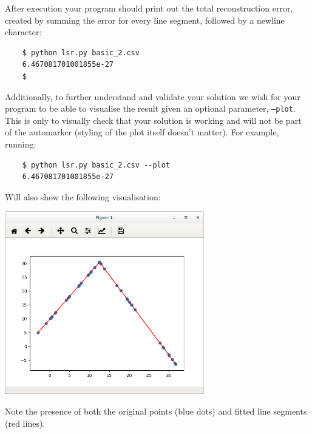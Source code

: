 \documentclass[12pt]{article}
\begin{document}
After execution your program should print out the total reconstruction error, created by summing the error for every line segment, followed by a newline character:

\begin{verbatim}
    $ python lsr.py basic_2.csv
    6.467081701001855e-27
    $
\end{verbatim}

Additionally, to further understand and validate your solution we wish for your program to be able to visualise the result given an optional parameter, \texttt{--plot}.
This is only to visually check that your solution is working and will not be part of the automarker (styling of the plot itself doesn't matter).
For example, running:

\begin{verbatim}
    $ python lsr.py basic_2.csv --plot
    6.467081701001855e-27
\end{verbatim}

Will also show the following visualisation:

\includegraphics[width=0.65\textwidth]{CW1_visualisation}

Note the presence of both the original points (blue dots) and fitted line segments (red lines).
\end{document}
